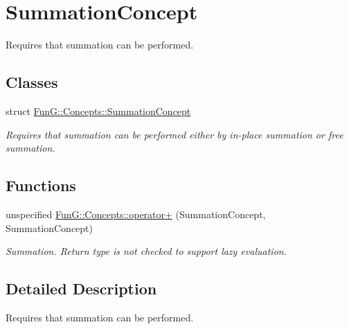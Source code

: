\hypertarget{group__SummationConcept}{\section{Summation\-Concept}
\label{group__SummationConcept}
}


Requires that summation can be performed.  


\subsection*{Classes}
\begin{DoxyCompactItemize}
\item 
struct \hyperlink{structFunG_1_1Concepts_1_1SummationConcept}{Fun\-G\-::\-Concepts\-::\-Summation\-Concept}
\begin{DoxyCompactList}\small\item\em Requires that summation can be performed either by in-\/place summation or free summation. \end{DoxyCompactList}\end{DoxyCompactItemize}
\subsection*{Functions}
\begin{DoxyCompactItemize}
\item 
\hypertarget{group__SummationConcept_gab9d1639ea6ed1088ec5bfbee24625f89}{unspecified \hyperlink{group__SummationConcept_gab9d1639ea6ed1088ec5bfbee24625f89}{Fun\-G\-::\-Concepts\-::operator+} (Summation\-Concept, Summation\-Concept)}\label{group__SummationConcept_gab9d1639ea6ed1088ec5bfbee24625f89}

\begin{DoxyCompactList}\small\item\em Summation. Return type is not checked to support lazy evaluation. \end{DoxyCompactList}\end{DoxyCompactItemize}


\subsection{Detailed Description}
Requires that summation can be performed. 
